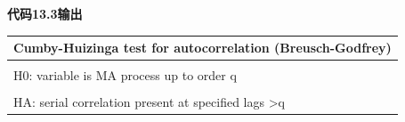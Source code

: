 \documentclass[
  chinese-hans,
  letterpaper,
  DIV=11,
  numbers=noendperiod]{scrreprt}
\newcounter{none} %
\begin{document}
\begin{tcolorbox}[enhanced jigsaw, arc=.35mm, bottomrule=.15mm, breakable, colback=white, colframe=quarto-callout-note-color-frame, left=2mm, leftrule=.75mm, opacityback=0, rightrule=.15mm, toprule=.15mm]

\vspace{-3mm}\textbf{代码13.3输出}\vspace{3mm}

{\def\LTcaptype{none} %
\begin{longtable}[]{@{}l@{}}
\toprule\noalign{}
Cumby-Huizinga test for autocorrelation (Breusch-Godfrey) \\
\midrule\noalign{}
\endhead
\bottomrule\noalign{}
\endlastfoot
 \\
H0: variable is MA process up to order q \\
 \\
HA: serial correlation present at specified lags \textgreater q \\
\end{longtable}
}


\end{tcolorbox}
\end{document}
